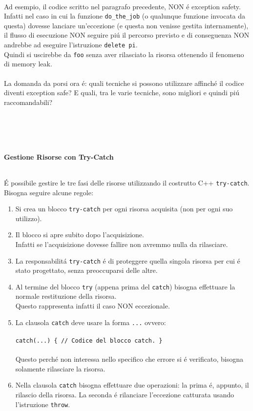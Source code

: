 \documentclass{article}
\begin{document}
\\Ad esempio, il codice scritto nel paragrafo precedente, NON \'e exception safety. \\Infatti nel caso in cui la funzione \texttt{do\_the\_job} (o qualunque funzione invocata da questa) dovesse lanciare un'eccezione (e questa non venisse gestita internamente), il flusso di esecuzione NON seguire pi\'u il percorso previsto e di conseguenza NON andrebbe ad eseguire l'istruzione \texttt{delete pi}.\\Quindi si uscirebbe da \texttt{foo} senza aver rilasciato la risorsa ottenendo il fenomeno di memory leak.\\
\\La domanda da porsi ora \'e: quali tecniche si possono utilizzare affinch\'e il codice diventi exception safe? E quali, tra le varie tecniche, sono migliori e quindi pi\'u raccomandabili?
\\ \\ \\ \\ \\
\begin{large}\textbf{\textcolor{blu}{Gestione Risorse con Try-Catch}}\\ \\ \end{large}
\'E possibile gestire le tre fasi delle risorse utilizzando il costrutto C++ \texttt{try-catch}. Bisogna seguire alcune regole:\\
\begin{enumerate}
\item Si crea un blocco \texttt{try-catch} per ogni risorsa acquisita (non per ogni suo utilizzo).
\item Il blocco si apre subito dopo l'acquisizione. \\Infatti se l'acquisizione dovesse fallire non avremmo nulla da rilasciare.
\item La responsabilit\'a \texttt{try-catch} \'e di proteggere quella singola risorsa per cui \'e stato progettato, senza preoccuparsi delle altre.
\item Al termine del blocco \texttt{try} (appena prima del \texttt{catch}) bisogna effettuare la normale restituzione della risorsa.\\ Questo rappresenta infatti il caso NON eccezionale.
\item La clausola \texttt{catch} deve usare la forma \texttt{...} ovvero:\\ \\ \texttt{catch(...) \{ \textcolor{grigio}{// Codice del blocco catch.} \} }\\ \\ Questo perch\'e non interessa nello specifico che errore si \'e verificato, bisogna solamente rilasciare la risorsa.\\
\item Nella clausola \texttt{catch} bisogna effettuare due operazioni: la prima \'e, appunto, il rilascio della risorsa. La seconda \'e rilanciare l'eccezione catturata usando l'istruzione \texttt{throw}. \\
\end{enumerate}
\end{document}
